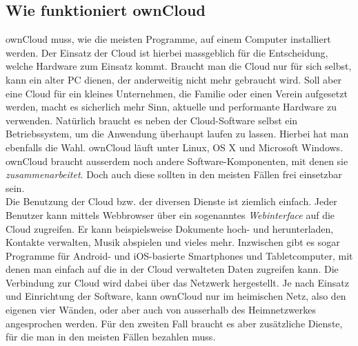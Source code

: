\subsection{Wie funktioniert ownCloud}
ownCloud muss, wie die meisten Programme, auf einem Computer installiert werden. Der Einsatz der Cloud ist hierbei massgeblich für die Entscheidung, welche Hardware zum Einsatz kommt. Braucht man die Cloud nur für sich selbst, kann ein alter PC dienen, der anderweitig nicht mehr gebraucht wird. Soll aber eine Cloud für ein kleines Unternehmen, die Familie oder einen Verein aufgesetzt werden, macht es sicherlich mehr Sinn, aktuelle und performante Hardware zu verwenden. Natürlich braucht es neben der Cloud-Software selbst ein Betriebssystem, um die Anwendung überhaupt laufen zu lassen. Hierbei hat man ebenfalls die Wahl. ownCloud läuft unter Linux, OS X und Microsoft Windows. ownCloud braucht ausserdem noch andere Software-Komponenten, mit denen sie \textit{zusammenarbeitet}. Doch auch diese sollten in den meisten Fällen frei einsetzbar sein.
\\
Die Benutzung der Cloud bzw. der diversen Dienste ist ziemlich einfach. Jeder Benutzer kann mittels Webbrowser über ein sogenanntes \textit{Webinterface} auf die Cloud zugreifen. Er kann beispielsweise Dokumente hoch- und herunterladen, Kontakte verwalten, Musik abspielen und vieles mehr. Inzwischen gibt es sogar Programme für Android- und iOS-basierte Smartphones und Tabletcomputer, mit denen man einfach auf die in der Cloud verwalteten Daten zugreifen kann. Die Verbindung zur Cloud wird dabei über das Netzwerk hergestellt. Je nach Einsatz und Einrichtung der Software, kann ownCloud nur im heimischen Netz, also den eigenen vier Wänden, oder aber auch von ausserhalb des Heimnetzwerkes angesprochen werden. Für den zweiten Fall braucht es aber zusätzliche Dienste, für die man in den meisten Fällen bezahlen muss.

